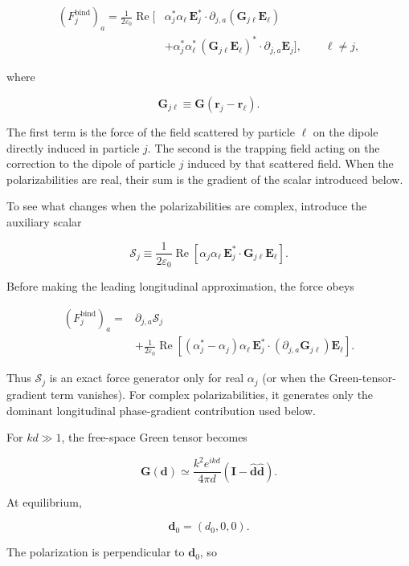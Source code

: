 \[
\begin{aligned}
(F_j^{\mathrm{bind}})_a
=\frac{1}{2\varepsilon_0}\operatorname{Re}\!\Big[{}
&\alpha_j^*\alpha_\ell\,
\mathbf E_j^* \cdot
\partial_{j,a}\!\left(\mathbf G_{j\ell}\mathbf E_\ell\right)\\
&+\alpha_j^*\alpha_\ell^*\,
(\mathbf G_{j\ell}\mathbf E_\ell)^* \cdot
\partial_{j,a}\mathbf E_j
\Big],
\qquad \ell\neq j,
\end{aligned}
\]

where

\[
\mathbf G_{j\ell}\equiv
\mathbf G(\mathbf r_j-\mathbf r_\ell).
\]

The first term is the force of the field scattered by particle $\ell$ on the
dipole directly induced in particle $j$.  The second is the trapping field
acting on the correction to the dipole of particle $j$ induced by that
scattered field.  When the polarizabilities are real, their sum is the
gradient of the scalar introduced below.

To see what changes when the polarizabilities are complex, introduce the
auxiliary scalar

\[
\mathcal S_j\equiv
\frac{1}{2\varepsilon_0}\operatorname{Re}\!\left[
\alpha_j\alpha_\ell\,
\mathbf E_j^*\cdot\mathbf G_{j\ell}\mathbf E_\ell
\right].
\]

Before making the leading longitudinal approximation, the force obeys

\[
\begin{aligned}
(F_j^{\mathrm{bind}})_a
={}&\partial_{j,a}\mathcal S_j\\
&+\frac{1}{2\varepsilon_0}\operatorname{Re}\!\left[
(\alpha_j^*-\alpha_j)\alpha_\ell\,
\mathbf E_j^*\cdot
(\partial_{j,a}\mathbf G_{j\ell})\mathbf E_\ell
\right].
\end{aligned}
\]

Thus $\mathcal S_j$ is an exact force generator only for real $\alpha_j$ (or
when the Green-tensor-gradient term vanishes).  For complex polarizabilities,
it generates only the dominant longitudinal phase-gradient contribution used
below.

For $kd\gg1$, the free-space Green tensor becomes

\[
\mathbf G(\mathbf d) \simeq \frac{k^2e^{ikd}}{4\pi d} \left(\mathbf I-\hat{\mathbf d}\hat{\mathbf d}\right).
\]

At equilibrium,

\[
\mathbf d_0=(d_0,0,0).
\]

The polarization is perpendicular to $\mathbf d_0$, so


